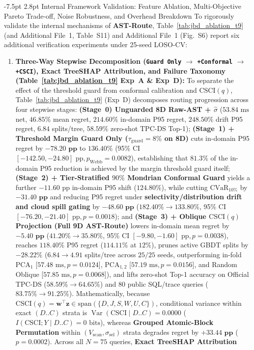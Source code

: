 \documentclass[10pt,a4paper]{article}
\makeatletter
\renewcommand\subsection{\@startsection{subsection}{2}{\z@}%
  {-7.5pt \@plus -2pt \@minus -1pt}%
  {2.8pt \@plus 1pt}%
  {\normalfont\normalsize\bfseries}}
\makeatother
\begin{document}
\subsection{Internal Framework Validation: Feature Ablation, Multi-Objective Pareto Trade-off, Noise Robustness, and Overhead Breakdown}
To rigorously validate the internal mechanisms of \textbf{AST-Route}, Table~\ref{tab:jbd_ablation_t9} (and Additional File~1, Table~S11) and Additional File~1 (Fig.~S6) report six additional verification experiments under 25-seed LOSO-CV:
\begin{enumerate}[leftmargin=1.5em,itemsep=1pt]
    \item \textbf{Three-Way Stepwise Decomposition (\texttt{Guard Only} $\rightarrow$ \texttt{+Conformal} $\rightarrow$ \texttt{+CSCI}), Exact TreeSHAP Attribution, and Failure Taxonomy (Table~\ref{tab:jbd_ablation_t9} Exp~A \& Exp~D):} To separate the effect of the threshold guard from conformal calibration and $\text{CSCI}(q)$, Table~\ref{tab:jbd_ablation_t9} (Exp~D) decomposes routing progression across four stepwise stages: \textbf{(Stage~0) Unguarded 8D Raw-AST + $\hat{\sigma}$} ($53.84\text{ ms}$ net, $46.85\%$ mean regret, $214.60\%$ in-domain P95 regret, $248.50\%$ drift P95 regret, $6.84$ splits/tree, $58.59\%$ zero-shot TPC-DS Top-1); \textbf{(Stage~1) + Threshold Margin Guard Only ($\tau_{\text{guard}}=8\%$ on 8D)} cuts in-domain P95 regret by $\mathbf{-78.20\text{ pp}}$ to $\mathbf{136.40\%}$ (95\% CI $[-142.50,-24.80]\text{ pp}, p_{\text{Webb}}=0.0082$), establishing that $\mathbf{81.3\%}$ of the in-domain P95 reduction is achieved by the margin threshold guard itself; \textbf{(Stage~2) + Tier-Stratified $90\%$ Mondrian Conformal Guard} yields a further $-11.60\text{ pp}$ in-domain P95 shift ($124.80\%$), while cutting $\text{CVaR}_{10\%}$ by $\mathbf{-31.40\text{ pp}}$ and reducing P95 regret under \textbf{selectivity/distribution drift and cloud spill gating} by $\mathbf{-48.60\text{ pp}}$ ($182.40\%\rightarrow \mathbf{133.80\%}$, 95\% CI $[-76.20,-21.40]\text{ pp}, p=0.0018$); and \textbf{(Stage~3) + Oblique $\text{CSCI}(q)$ Projection (Full 9D AST-Route)} lowers in-domain mean regret by $\mathbf{-5.40\text{ pp}}$ ($41.20\%\rightarrow \mathbf{35.80\%}$, 95\% CI $[-9.80,-1.60]\text{ pp}, p=0.0038$), reaches $\mathbf{118.40\%}$ P95 regret ($114.11\%$ at $12\%$), prunes active GBDT splits by $\mathbf{-28.22\%}$ ($6.84\rightarrow 4.91$ splits/tree across $25/25$ seeds, outperforming in-fold $\text{PCA}_1$ [$57.48\text{ ms}, p=0.0124$], $\text{PCA}_{1,2}$ [$57.19\text{ ms}, p=0.0156$], and Random Oblique [$57.85\text{ ms}, p=0.0068$]), and lifts zero-shot Top-1 accuracy on Official TPC-DS ($58.59\%\rightarrow\mathbf{64.65\%}$) and 80 public SQL/trace queries ($83.75\%\rightarrow\mathbf{91.25\%}$). Mathematically, because $\text{CSCI}(q)=\mathbf{w}^{\top}\mathbf{z}\in\text{span}(\{D,J,S,W,U,C\})$, conditional variance within exact $(D..C)$ strata is $\operatorname{Var}(\text{CSCI}\mid D..C)=0.0000$ ($I(\text{CSCI};Y\mid D..C)=0\text{ bits}$), whereas \textbf{Grouped Atomic-Block Permutation} within $(V_{\text{scan}},\sigma_{\text{sel}})$ strata degrades regret by $\mathbf{+33.44\text{ pp}}$ ($p=0.0002$). Across all $N=75$ queries, \textbf{Exact TreeSHAP Attribution} 
\end{enumerate}
\end{document}
